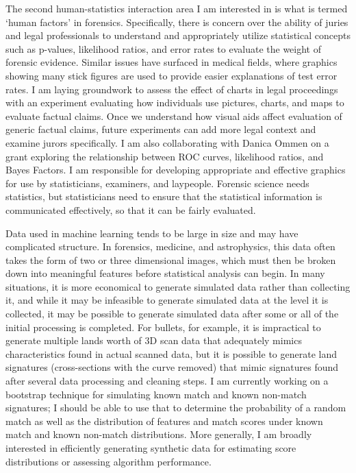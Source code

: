 \documentclass[12pt, letterpaper, sans]{moderncv}
\begin{document}
The second human-statistics interaction area I am interested in is what is termed `human factors' in forensics. Specifically, there is concern over the ability of juries and legal professionals to understand and appropriately utilize statistical concepts such as p-values, likelihood ratios, and error rates to evaluate the weight of forensic evidence. Similar issues have surfaced in medical fields, where graphics showing many stick figures are used to provide easier explanations of test error rates. I am laying groundwork to assess the effect of charts in legal proceedings with an experiment evaluating how individuals use pictures, charts, and maps to evaluate factual claims. Once we understand how visual aids affect evaluation of generic factual claims, future experiments can add more legal context and examine jurors specifically. I am also collaborating with Danica Ommen on a grant exploring the relationship between ROC curves, likelihood ratios, and Bayes Factors. I am responsible for developing appropriate and effective graphics for use by statisticians, examiners, and laypeople. Forensic science needs statistics, but statisticians need to ensure that the statistical information is communicated effectively, so that it can be fairly evaluated. 

Data used in machine learning tends to be large in size and may have complicated structure. In forensics, medicine, and astrophysics, this data often takes the form of two or three dimensional images, which must then be broken down into meaningful features before statistical analysis can begin. In many situations, it is more economical to generate simulated data rather than collecting it, and while it may be infeasible to generate simulated data at the level it is collected, it may be possible to generate simulated data after some or all of the initial processing is completed. For bullets, for example, it is impractical to generate multiple lands worth of 3D scan data that adequately mimics characteristics found in actual scanned data, but it is possible to generate land signatures (cross-sections with the curve removed) that mimic signatures found after several data processing and cleaning steps. I am currently working on a bootstrap technique for simulating known match and known non-match signatures; I should be able to use that to determine the probability of a random match as well as the distribution of features and match scores under known match and known non-match distributions. More generally, I am broadly interested in efficiently generating synthetic data for estimating score distributions or assessing algorithm performance. 
\end{document}
